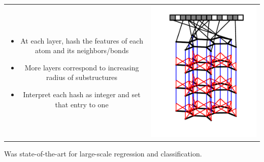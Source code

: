 \documentclass[landscape,a0b,final,a4resizeable]{include/a0poster}
\begin{document}
\begin{poster}
\begin{multicols}{3}
\begin{tabular}{cc}
\begin{minipage}[c]{0.5\columnwidth}
\begin{itemize}
  \item At each layer, hash the features of each atom and its neighbors/bonds
  \item More layers correspond to increasing radius of substructures
  \item Interpret each hash as integer and set that entry to one
\end{itemize}
\end{minipage} & 
\begin{minipage}[c]{0.5\columnwidth}
\centerline{\includegraphics[width=0.9\columnwidth, clip, trim=4mm 12mm 4mm 4mm]{figures/fig_1}}
\end{minipage}
\end{tabular}

\vspace{0.5in}

Was state-of-the-art for large-scale regression and classification.



\newpage %



\end{multicols}
\end{poster}
\end{document}
